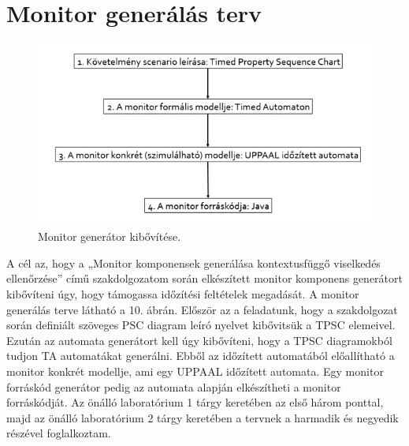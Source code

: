 \chapter{Monitor generálás terv}

\begin{figure}[!ht]
    \centering
    \includegraphics[width=150mm, keepaspectratio]{figures/10abra.png}
    \caption{Monitor generátor kibővítése.}
\end{figure}

A cél az, hogy a „Monitor komponensek generálása kontextusfüggő viselkedés ellenőrzése” című szakdolgozatom során elkészített monitor komponens generátort kibővíteni úgy, hogy támogassa időzítési feltételek megadását. A monitor generálás terve látható a 10. ábrán. Először az a feladatunk, hogy a szakdolgozat során definiált szöveges PSC diagram leíró nyelvet kibővitsük a TPSC elemeivel. Ezután az automata generátort kell úgy kibővíteni, hogy a TPSC diagramokból tudjon TA automatákat generálni. Ebből az időzített automatából előallítható a monitor konkrét modellje, ami egy UPPAAL időzített automata. Egy monitor forráskód generátor pedig az automata alapján elkészítheti a monitor forráskódját. Az önálló laboratórium 1 tárgy keretében az első három ponttal, majd az önálló laboratórium 2 tárgy keretében a tervnek a harmadik és negyedik részével foglalkoztam.
